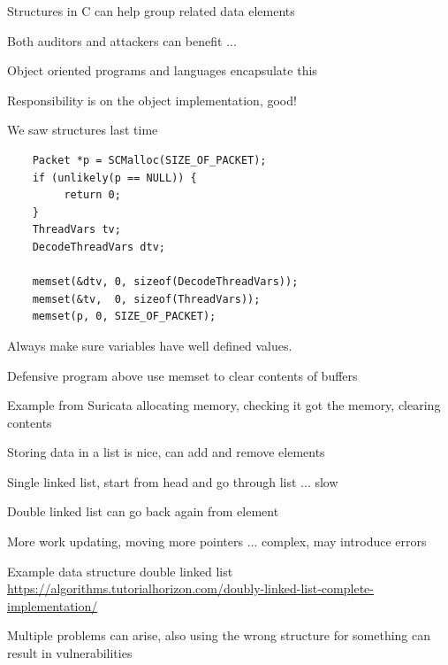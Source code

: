\documentclass[Screen16to9,17pt]{foils}
\begin{document}
\begin{list2}
\item Structures in C can help group related data elements
\item Both auditors and attackers can benefit ...
\item Object oriented programs and languages encapsulate this
\item Responsibility is on the object implementation, good!
\item We saw structures last time
\end{list2}




\begin{verbatim}
    Packet *p = SCMalloc(SIZE_OF_PACKET);
    if (unlikely(p == NULL)) {
         return 0;
    }
    ThreadVars tv;
    DecodeThreadVars dtv;

    memset(&dtv, 0, sizeof(DecodeThreadVars));
    memset(&tv,  0, sizeof(ThreadVars));
    memset(p, 0, SIZE_OF_PACKET);
\end{verbatim}

\begin{list2}
\item Always make sure variables have well defined values.
\item Defensive program above use memset to clear contents of buffers
\item Example from Suricata allocating memory, checking it got the memory, clearing contents
\end{list2}




\begin{list2}
\item Storing data in a list is nice, can add and remove elements
\item Single linked list, start from head and go through list ... slow
\item Double linked list can go back again from element
\item More work updating, moving more pointers ... complex, may introduce errors
\item Example data structure double linked list\\
\url{https://algorithms.tutorialhorizon.com/doubly-linked-list-complete-implementation/}
\item Multiple problems can arise, also using the wrong structure for something can result in vulnerabilities
\end{list2}
\end{document}
